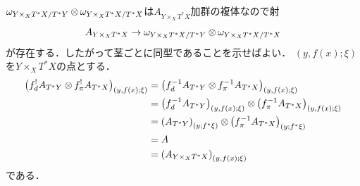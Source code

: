 \documentclass[leqno, 10pt, a4paper, dvipdfmx]{jsarticle}
\makeatletter
\theoremstyle{definition}
\renewenvironment{proof}[1][\proofname]{\par
  \pushQED{\qed}%
  \normalfont \topsep6\p@\@plus6\p@\relax
  \trivlist
  \item[\hskip\labelsep
         \bfseries
    {#1}]\ignorespaces
}{%
  \popQED\endtrivlist\@endpefalse
}
\renewcommand{\proofname}{証明.}
\numberwithin{equation}{section}
\newcommand{\tens}[1][]{\mathbin{\otimes_{\raise1.5ex\hbox to-.1em{}{#1}}}}
\theoremstyle{mystyle}
\newcommand{\mpb}[1][]{{#1}_{\pi}} %
\newcommand{\mdiff}[1][]{{#1}_{d}} %
\newcommand{\cotb}[1][]{T^{\ast}{#1}}
\makeatother
\begin{document}
\begin{proof}
  \(
    \omega_{{Y\mathbin{\times_{X}}\cotb[X]}\mathbin{/}\cotb[Y]}
    \tens[]
    \omega_{{Y\mathbin{\times_{X}}\cotb[X]}\mathbin{/}\cotb[X]}
  \)は\(A_{Y\mathbin{\times_{X}}\cotb[X]}\)加群の複体なので射
  \[
    A_{Y\mathbin{\times_{X}}\cotb[X]}
    \to
    \omega_{{Y\mathbin{\times_{X}}\cotb[X]}\mathbin{/}\cotb[Y]}
    \tens[]
    \omega_{{Y\mathbin{\times_{X}}\cotb[X]}\mathbin{/}\cotb[X]}
  \]
  が存在する．したがって茎ごとに同型であることを示せばよい．
  \((y,f(x);\xi)\)を\(Y\mathbin{\times_{X}}\cotb[X]\)の点とする．
  \begin{align*}
    \left(
      \mdiff[f]^{!}A_{\cotb[Y]}\tens[]\mpb[f]^{!}A_{\cotb[X]}
    \right)_{(y,f(x);\xi)}
    &=\left(
      \mdiff[f]^{-1}A_{\cotb[Y]}\tens[]\mpb[f]^{-1}A_{\cotb[X]}
    \right)_{(y,f(x);\xi)}\\
    &=\left(\mdiff[f]^{-1}A_{\cotb[Y]}\right)_{(y,f(x);\xi)}
    \tens[]\left(\mpb[f]^{-1}A_{\cotb[X]}
    \right)_{(y,f(x);\xi)}\\
    &=\left(A_{\cotb[Y]}\right)_{(y;f^{\ast}\xi)}
    \tens[]\left(\mpb[f]^{-1}A_{\cotb[X]}
    \right)_{(y;f^{\ast}\xi)}\\
    &=A\\
    &=\left(A_{Y\mathbin{\times_{X}}\cotb[X]}\right)_{(y,f(x);\xi)}
  \end{align*}
  である．
\end{proof}
\end{document}
